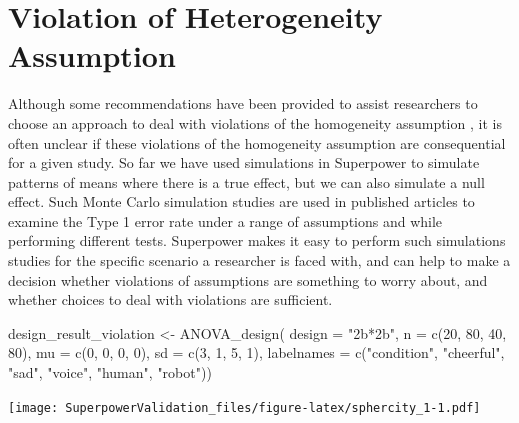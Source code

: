 \documentclass[
]{book}
\newenvironment{Shaded}{\begin{snugshade}}{\end{snugshade}}
\newcommand{\AttributeTok}[1]{\textcolor[rgb]{0.77,0.63,0.00}{#1}}
\newcommand{\DecValTok}[1]{\textcolor[rgb]{0.00,0.00,0.81}{#1}}
\newcommand{\FunctionTok}[1]{\textcolor[rgb]{0.00,0.00,0.00}{#1}}
\newcommand{\NormalTok}[1]{#1}
\newcommand{\OtherTok}[1]{\textcolor[rgb]{0.56,0.35,0.01}{#1}}
\newcommand{\StringTok}[1]{\textcolor[rgb]{0.31,0.60,0.02}{#1}}
\begin{document}
\hypertarget{violation-of-heterogeneity-assumption}{%
\section{Violation of Heterogeneity Assumption}\label{violation-of-heterogeneity-assumption}}

Although some recommendations have been provided to assist researchers to choose an approach to deal with violations of the homogeneity assumption \citep{algina_detecting_1997}, it is often unclear if these violations of the homogeneity assumption are consequential for a given study.
So far we have used simulations in Superpower to simulate patterns of means where there is a true effect, but we can also simulate a null effect.
Such Monte Carlo simulation studies are used in published articles to examine the Type 1 error rate under a range of assumptions and while performing different tests.
Superpower makes it easy to perform such simulations studies for the specific scenario a researcher is faced with, and can help to make a decision whether violations of assumptions are something to worry about, and whether choices to deal with violations are sufficient.

\begin{Shaded}
\begin{Highlighting}[]
\NormalTok{design\_result\_violation }\OtherTok{\textless{}{-}} \FunctionTok{ANOVA\_design}\NormalTok{(}
  \AttributeTok{design =} \StringTok{"2b*2b"}\NormalTok{,}
  \AttributeTok{n =} \FunctionTok{c}\NormalTok{(}\DecValTok{20}\NormalTok{, }\DecValTok{80}\NormalTok{, }\DecValTok{40}\NormalTok{, }\DecValTok{80}\NormalTok{),}
  \AttributeTok{mu =} \FunctionTok{c}\NormalTok{(}\DecValTok{0}\NormalTok{, }\DecValTok{0}\NormalTok{, }\DecValTok{0}\NormalTok{, }\DecValTok{0}\NormalTok{),}
  \AttributeTok{sd =} \FunctionTok{c}\NormalTok{(}\DecValTok{3}\NormalTok{, }\DecValTok{1}\NormalTok{, }\DecValTok{5}\NormalTok{, }\DecValTok{1}\NormalTok{),}
  \AttributeTok{labelnames =} \FunctionTok{c}\NormalTok{(}\StringTok{"condition"}\NormalTok{, }\StringTok{"cheerful"}\NormalTok{, }\StringTok{"sad"}\NormalTok{, }\StringTok{"voice"}\NormalTok{, }\StringTok{"human"}\NormalTok{, }\StringTok{"robot"}\NormalTok{))}
\end{Highlighting}
\end{Shaded}

\texttt{[image: SuperpowerValidation\_files/figure-latex/sphercity\_1-1.pdf]}
\end{document}
